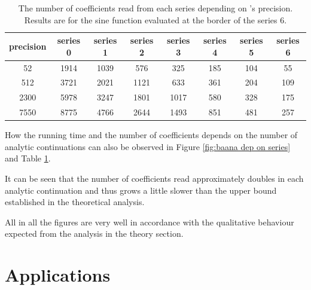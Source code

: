     \begin{table}
      \centering
      \begin{tabular}{|c||c|c|c|c|c|c|c|}
        \hline
        precision & series 0&series 1&series 2&series 3&series 4&series 5&series 6 \\ \hline
        52 &1914&1039&576&325&185&104&55 \\ \hline 
        512 &3721&2021&1121&633&361&204&109 \\ \hline
        2300 &5978&3247&1801&1017&580&328&175 \\ \hline
        7550 &8775 & 4766 & 2644 & 1493&851&481&257 \\ \hline
      \end{tabular}
      \caption{The number of coefficients read from each series depending on {\irram}'s precision. 
    Results are for the sine function evaluated at the border of the series 6.}\label{table: coefficients dep on precision} 
    \end{table}
		How the running time and the number of coefficients depends on the number of analytic continuations can also be observed in Figure \ref{fig:baana dep on series} 
    and Table \ref{table: coefficients dep on precision}.

    It can be seen that the number of coefficients read approximately doubles in each analytic continuation and thus grows 
    a little slower than the upper bound established in the theoretical analysis.

		All in all the figures are very well in accordance with the qualitative behaviour expected from the analysis in the theory section.
	\section{Applications}
